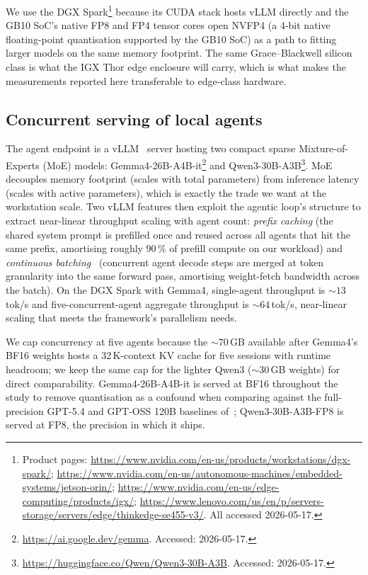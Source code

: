 \documentclass[journal]{IEEEtran}
\begin{document}
We use the DGX Spark\footnote{Product pages: \url{https://www.nvidia.com/en-us/products/workstations/dgx-spark/}; \url{https://www.nvidia.com/en-us/autonomous-machines/embedded-systems/jetson-orin/}; \url{https://www.nvidia.com/en-us/edge-computing/products/igx/}; \url{https://www.lenovo.com/us/en/p/servers-storage/servers/edge/thinkedge-se455-v3/}. All accessed 2026-05-17.} because its CUDA stack hosts vLLM directly and the GB10 SoC's native FP8 and FP4 tensor cores open NVFP4 (a 4-bit native floating-point quantisation supported by the GB10 SoC) as a path to fitting larger models on the same memory footprint. The same Grace--Blackwell silicon class is what the IGX Thor edge enclosure will carry, which is what makes the measurements reported here transferable to edge-class hardware. 

\subsection{Concurrent serving of local agents}

The agent endpoint is a vLLM~\cite{kwon2023vllm} server hosting two compact sparse Mixture-of-Experts (MoE) models: Gemma4-26B-A4B-it\footnote{\url{https://ai.google.dev/gemma}. Accessed: 2026-05-17.} and Qwen3-30B-A3B\footnote{\url{https://huggingface.co/Qwen/Qwen3-30B-A3B}. Accessed: 2026-05-17.}. MoE~\cite{fedus2022switch} decouples memory footprint (scales with total parameters) from inference latency (scales with active parameters), which is exactly the trade we want at the workstation scale. Two vLLM features then exploit the agentic loop's structure to extract near-linear throughput scaling with agent count: \emph{prefix caching} (the shared system prompt is prefilled once and reused across all agents that hit the same prefix, amortising roughly 90\,\% of prefill compute on our workload) and \emph{continuous batching}~\cite{yu2022orca} (concurrent agent decode steps are merged at token granularity into the same forward pass, amortising weight-fetch bandwidth across the batch). On the DGX Spark with Gemma4, single-agent throughput is ${\sim}13$\,tok/s and five-concurrent-agent aggregate throughput is ${\sim}64$\,tok/s, near-linear scaling that meets the framework's parallelism needs.

We cap concurrency at five agents because the ${\sim}70$\,GB available after Gemma4's BF16 weights hosts a 32\,K-context KV cache for five sessions with runtime headroom; we keep the same cap for the lighter Qwen3 (${\sim}30$\,GB weights) for direct comparability. Gemma4-26B-A4B-it is served at BF16 throughout the study to remove quantisation as a confound when comparing against the full-precision GPT-5.4 and GPT-OSS 120B baselines of~\cite{aitaoudia2026aite}; Qwen3-30B-A3B-FP8 is served at FP8, the precision in which it ships.
\end{document}
